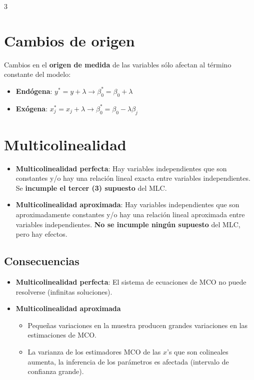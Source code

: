 \documentclass[10pt, a4paper, landscape]{article}
\begin{document}
\begin{multicols}{3}
\section*{Cambios de origen}

Cambios en el \textbf{origen de medida} de las variables sólo afectan al término constante del modelo:

\begin{itemize}[leftmargin=*]
	\item \textbf{Endógena}: \( y^{*} = y + \lambda \rightarrow \beta_{0}^{*} = \beta_{0} + \lambda \)
	\item \textbf{Exógena}: \( x_{j}^{*} = x_{j} + \lambda \rightarrow \beta_{0}^{*} = \beta_{0} - \lambda \beta_{j} \)
\end{itemize}

\columnbreak

\section*{Multicolinealidad}

\begin{itemize}[leftmargin=*]
	\item \textbf{Multicolinealidad perfecta}: Hay variables independientes que son constantes y/o hay una relación lineal exacta entre variables independientes. Se \textbf{incumple el tercer (3) supuesto} del MLC.
	\item \textbf{Multicolinealidad aproximada}: Hay variables independientes que son aproximadamente constantes y/o hay una relación lineal aproximada entre variables independientes. \textbf{No se incumple ningún supuesto} del MLC, pero hay efectos.
\end{itemize}

\subsection*{Consecuencias}

\begin{itemize}[leftmargin=*]
	\item \textbf{Multicolinealidad perfecta}: El sistema de ecuaciones de MCO no puede resolverse (infinitas soluciones).
	\item \textbf{Multicolinealidad aproximada}
	\begin{itemize}[leftmargin=*]
		\item Pequeñas variaciones en la muestra producen grandes variaciones en las estimaciones de MCO.
		\item La varianza de los estimadores MCO de las \( x \)'s que son colineales aumenta, la inferencia de los parámetros es afectada (intervalo de confianza grande).
	\end{itemize}
\end{itemize}


\end{multicols}
\end{document}
